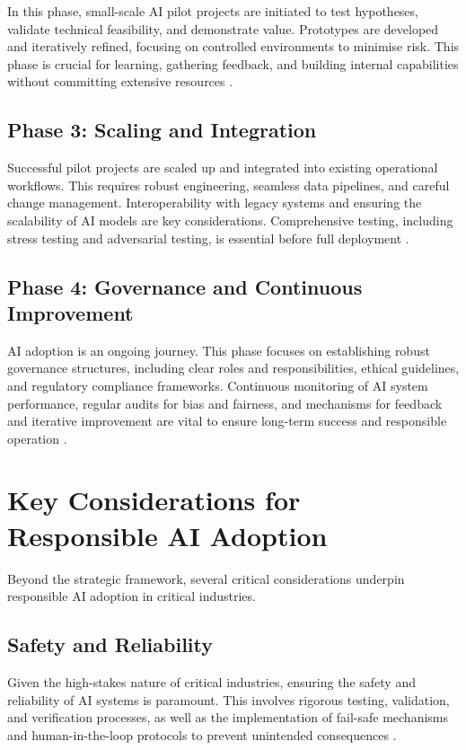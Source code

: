 In this phase, small-scale AI pilot projects are initiated to test hypotheses, validate technical feasibility, and demonstrate value. Prototypes are developed and iteratively refined, focusing on controlled environments to minimise risk. This phase is crucial for learning, gathering feedback, and building internal capabilities without committing extensive resources \parencite{cisc2025artificial}.

\subsection{Phase 3: Scaling and Integration}

Successful pilot projects are scaled up and integrated into existing operational workflows. This requires robust engineering, seamless data pipelines, and careful change management. Interoperability with legacy systems and ensuring the scalability of AI models are key considerations. Comprehensive testing, including stress testing and adversarial testing, is essential before full deployment \parencite{dhs2024roles}.

\subsection{Phase 4: Governance and Continuous Improvement}

AI adoption is an ongoing journey. This phase focuses on establishing robust governance structures, including clear roles and responsibilities, ethical guidelines, and regulatory compliance frameworks. Continuous monitoring of AI system performance, regular audits for bias and fairness, and mechanisms for feedback and iterative improvement are vital to ensure long-term success and responsible operation \parencite{leyliabadi2025conceptual}.

\section{Key Considerations for Responsible AI Adoption}

Beyond the strategic framework, several critical considerations underpin responsible AI adoption in critical industries.

\subsection{Safety and Reliability}

Given the high-stakes nature of critical industries, ensuring the safety and reliability of AI systems is paramount. This involves rigorous testing, validation, and verification processes, as well as the implementation of fail-safe mechanisms and human-in-the-loop protocols to prevent unintended consequences \parencite{dhs2024roles}.

